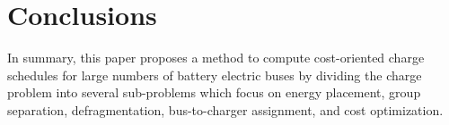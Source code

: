 \section{Conclusions}
In summary, this paper proposes a method to compute cost-oriented charge schedules for large numbers of battery electric buses by dividing the charge problem into several sub-problems which focus on energy placement, group separation, defragmentation, bus-to-charger assignment, and cost optimization. 

